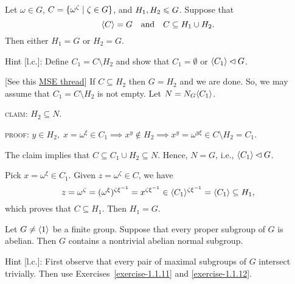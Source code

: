 \begin{exr}
    Let\/ $\omega \in G$, $C = \{\omega^\zeta \mid\zeta\in G\}$, and\/ $H_1, H_2\leqslant G$. Suppose that
    $$
        \langle C\rangle = G\quad\text{\rm and}\quad C \subseteq H_1 \cup H_2.
    $$
    Then either\/ $H_1 = G$ or\/ $H_2 = G$.

    \textrm{\rm Hint [l.c.]: Define $C_1=C\setminus H_2$ and show that $C_1=\emptyset$ or $\langle C_1\rangle\lhd G$.}
\end{exr}

\begin{solution} {[See this \href{https://math.stackexchange.com/a/1107676/269050}{MSE thread}]} If $C\subseteq H_2$ then $G=H_2$ and we are done. So, we may assume that $C_1=C\setminus H_2$ is not empty. Let $N=N_G\langle C_1\rangle$.

\textsc{claim:} $H_2\subseteq N$.

\textsc{proof:} $y\in H_2,\;x=\omega^\xi\in C_1\implies x^y\notin H_2\implies x^y=\omega^{y\xi}\in C\setminus H_2=C_1$.

The claim implies that $C\subseteq C_1\cup H_2 \subseteq N$. Hence, $N=G$, i.e., $\langle C_1\rangle\lhd G$.

Pick $x=\omega^\xi\in C_1$. Given $z=\omega^\zeta\in C$, we have
$$
    z = \omega^\zeta 
        = (\omega^\xi)^{\zeta\xi^{-1}}
        = x^{\zeta\xi^{-1}}
        \in \langle C_1\rangle^{\zeta\xi^{-1}}=\langle C_1\rangle \subseteq H_1,
$$
which proves that $C\subseteq H_1$. Then $H_1=G$.  \end{solution}

\begin{exr}
    Let\/ $G \ne\langle1\rangle$ be a finite group. Suppose that every proper subgroup of\/ $G$ is abelian. Then\/ $G$ contains a nontrivial abelian normal subgroup.

    \textrm{\rm Hint [l.c.]: First observe that every pair of maximal subgroups of $G$ intersect trivially. Then use Exercises~\ref{exercise-1.1.11} and \ref{exercise-1.1.12}.}
\end{exr}

